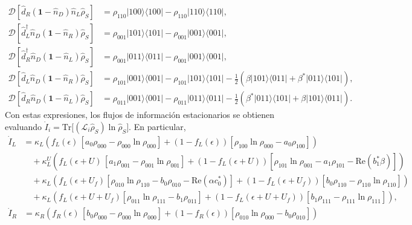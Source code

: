\begin{appendixs}
\begin{align*}
    \mathcal{D}[\hat{d}_{R}(\textbf{1}-\hat{n}_{D})\hat{n}_{L}\hat{\rho}_{S}] & = \rho_{110}|100\rangle \langle 100| - \rho_{110}|110\rangle \langle 110|, \\  
    \mathcal{D}[\hat{d}^{\dagger}_{L}\hat{n}_{D}(\textbf{1}-\hat{n}_{R})\hat{\rho}_{S}] & = \rho_{001}|101\rangle \langle 101| - \rho_{001}|001\rangle \langle 001|, \\ 
    \mathcal{D}[\hat{d}^{\dagger}_{R}\hat{n}_{D}(\textbf{1}-\hat{n}_{L})\hat{\rho}_{S}] & = \rho_{001}|011\rangle \langle 011| - \rho_{001}|001\rangle \langle 001|, \\  
    \mathcal{D}[\hat{d}_{L}\hat{n}_{D}(\textbf{1}-\hat{n}_{R})\hat{\rho}_{S}] & = \rho_{101}|001\rangle \langle 001| - \rho_{101}|101\rangle \langle 101| - \frac{1}{2}(\beta |101\rangle \langle 011| + \beta^{*}|011\rangle \langle 101|), \\ 
    \mathcal{D}[\hat{d}_{R}\hat{n}_{D}(\textbf{1}-\hat{n}_{L})\hat{\rho}_{S}] & = \rho_{011}|001\rangle \langle 001| - \rho_{011}|011\rangle \langle 011| - \frac{1}{2}(\beta^{*} |011\rangle \langle 101| + \beta|101\rangle \langle 011|).
\end{align*}
Con estas expresiones, los flujos de información estacionarios se obtienen evaluando
$\dot{I}_{i} = \mathrm{Tr}\!\big[(\mathcal{L}_{i}\hat{\rho}_{S}) \ln \hat{\rho}_{S}\big]$. En particular,
\begin{align*}
    \dot{I}_{L} &  =
      \kappa_{L}\!\left(f_{L}(\epsilon)\,[a_{0}\rho_{000} - \rho_{000}\ln \rho_{000}] + (1-f_{L}(\epsilon))[\rho_{100}\ln \rho_{000} - a_{0}\rho_{100}] \right) \\ 
      &\quad + \kappa^{U}_{L}\!\left(f_{L}(\epsilon + U)\,[a_{1}\rho_{001} - \rho_{001}\ln \rho_{001}] + (1-f_{L}(\epsilon + U))[\rho_{101}\ln \rho_{001} -a_{1}\rho_{101} - \mathrm{Re}(b^{*}_{1}\beta )] \right) \\  
      &\quad + \kappa_{L}\!\left( f_{L}(\epsilon + U_{f})[\rho_{010}\ln \rho_{110} -b_{0}\rho_{010} - \mathrm{Re}(\alpha c^{*}_{0})]  + (1-f_{L}(\epsilon + U_{f}))[b_{0}\rho_{110} - \rho_{110}\ln \rho_{110}] \right) \\  
      &\quad + \kappa_{L}\!\left( f_{L}(\epsilon + U + U_{f})[\rho_{011}\ln \rho_{111}- b_{1}\rho_{011}] + (1-f_{L}(\epsilon+U+U_{f}) )[b_{1}\rho_{111} - \rho_{111}\ln \rho_{111}] \right),
\end{align*}
\begin{align*}
    \dot{I}_{R} &  =
      \kappa_{R}\!\left(f_{R}(\epsilon)\,[b_{0}\rho_{000} - \rho_{000}\ln \rho_{000}] + (1-f_{R}(\epsilon))[\rho_{010}\ln \rho_{000} - b_{0}\rho_{010}] \right) \\ 

\end{align*}
\end{appendixs}
